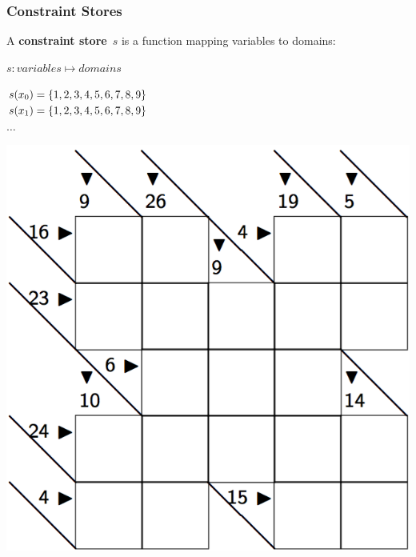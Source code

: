 \documentclass{beamer}
\newcommand{\Dom}[1]{\text{dom}({#1})}
\begin{document}
\begin{frame}
  \frametitle{Constraint Stores}
  \begin{definition}
    A \textbf{constraint store}~$s$ is a function mapping variables
    to domains:
    \begin{center}
      $s: variables \mapsto domains$
    \end{center}
  \end{definition}

    \begin{minipage}{0.5\textwidth}
      $s(x_0) = \left\{1,2,3,4,5,6,7,8,9\right\}$\\
      $s(x_1) = \left\{1,2,3,4,5,6,7,8,9\right\}$\\
      $\ldots$
    \end{minipage}
    \begin{minipage}{0.45\textwidth}
      \includegraphics[scale=0.15]{kakuro.png}
    \end{minipage}

\end{frame}
\end{document}
